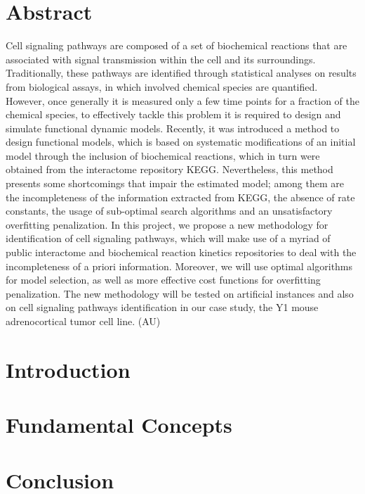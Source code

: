\documentclass[12pt, twoside]{report}
\numberwithin{mydefinition}{section}
\numberwithin{mytheorem}{section}
\numberwithin{mylemma}{section}
\numberwithin{corollary}{section}
\begin{document}
\chapter*{Abstract}
Cell signaling pathways are composed of a set of biochemical reactions 
that are associated with signal transmission within the cell and its 
surroundings. Traditionally, these pathways are identified through 
statistical analyses on results from biological assays, in which 
involved chemical species are quantified. However, once generally it is 
measured only a few time points for a fraction of the chemical species, 
to effectively tackle this problem it is required to design and simulate 
functional dynamic models. Recently, it was introduced a method to 
design functional models, which is based on systematic modifications of 
an initial model through the inclusion of biochemical reactions, which 
in turn were obtained from the interactome repository KEGG. 
Nevertheless, this method presents some shortcomings that impair the 
estimated model; among them are the incompleteness of the information 
extracted from KEGG, the absence of rate constants, the usage of 
sub-optimal search algorithms and an unsatisfactory overfitting 
penalization. In this project, we propose a new methodology for 
identification of cell signaling pathways, which will make use of a 
myriad of public interactome and biochemical reaction kinetics 
repositories to deal with the incompleteness of a priori information. 
Moreover, we will use optimal algorithms for model selection, as well as 
more effective cost functions for overfitting penalization. The new 
methodology will be tested on artificial instances and also on cell 
signaling pathways identification in our case study, the Y1 mouse 
adrenocortical tumor cell line. (AU)
 
\tableofcontents

\clearpage
{} 

\nocite{*}
\chapter{Introduction}
\label{chap:intro}


\chapter{Fundamental Concepts}
\label{chap:fundamental_concepts}


\chapter{Conclusion}
\label{chap:conclusion}


\newpage
\printbibliography
\end{document}
